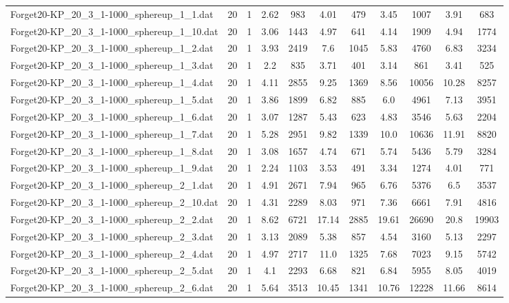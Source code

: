 \begin{table}[!ht]
\begin{tabular}{lcccccccccc}
Forget20-KP\_20\_3\_1-1000\_sphereup\_1\_1.dat & 20 & 1 & 2.62 & 983 & 4.01 & 479 & 3.45 & 1007 & 3.91 & 683 \\
Forget20-KP\_20\_3\_1-1000\_sphereup\_1\_10.dat & 20 & 1 & 3.06 & 1443 & 4.97 & 641 & 4.14 & 1909 & 4.94 & 1774 \\
Forget20-KP\_20\_3\_1-1000\_sphereup\_1\_2.dat & 20 & 1 & 3.93 & 2419 & 7.6 & 1045 & 5.83 & 4760 & 6.83 & 3234 \\
Forget20-KP\_20\_3\_1-1000\_sphereup\_1\_3.dat & 20 & 1 & 2.2 & 835 & 3.71 & 401 & 3.14 & 861 & 3.41 & 525 \\
Forget20-KP\_20\_3\_1-1000\_sphereup\_1\_4.dat & 20 & 1 & 4.11 & 2855 & 9.25 & 1369 & 8.56 & 10056 & 10.28 & 8257 \\
Forget20-KP\_20\_3\_1-1000\_sphereup\_1\_5.dat & 20 & 1 & 3.86 & 1899 & 6.82 & 885 & 6.0 & 4961 & 7.13 & 3951 \\
Forget20-KP\_20\_3\_1-1000\_sphereup\_1\_6.dat & 20 & 1 & 3.07 & 1287 & 5.43 & 623 & 4.83 & 3546 & 5.63 & 2204 \\
Forget20-KP\_20\_3\_1-1000\_sphereup\_1\_7.dat & 20 & 1 & 5.28 & 2951 & 9.82 & 1339 & 10.0 & 10636 & 11.91 & 8820 \\
Forget20-KP\_20\_3\_1-1000\_sphereup\_1\_8.dat & 20 & 1 & 3.08 & 1657 & 4.74 & 671 & 5.74 & 5436 & 5.79 & 3284 \\
Forget20-KP\_20\_3\_1-1000\_sphereup\_1\_9.dat & 20 & 1 & 2.24 & 1103 & 3.53 & 491 & 3.34 & 1274 & 4.01 & 771 \\
Forget20-KP\_20\_3\_1-1000\_sphereup\_2\_1.dat & 20 & 1 & 4.91 & 2671 & 7.94 & 965 & 6.76 & 5376 & 6.5 & 3537 \\
Forget20-KP\_20\_3\_1-1000\_sphereup\_2\_10.dat & 20 & 1 & 4.31 & 2289 & 8.03 & 971 & 7.36 & 6661 & 7.91 & 4816 \\
Forget20-KP\_20\_3\_1-1000\_sphereup\_2\_2.dat & 20 & 1 & 8.62 & 6721 & 17.14 & 2885 & 19.61 & 26690 & 20.8 & 19903 \\
Forget20-KP\_20\_3\_1-1000\_sphereup\_2\_3.dat & 20 & 1 & 3.13 & 2089 & 5.38 & 857 & 4.54 & 3160 & 5.13 & 2297 \\
Forget20-KP\_20\_3\_1-1000\_sphereup\_2\_4.dat & 20 & 1 & 4.97 & 2717 & 11.0 & 1325 & 7.68 & 7023 & 9.15 & 5742 \\
Forget20-KP\_20\_3\_1-1000\_sphereup\_2\_5.dat & 20 & 1 & 4.1 & 2293 & 6.68 & 821 & 6.84 & 5955 & 8.05 & 4019 \\
Forget20-KP\_20\_3\_1-1000\_sphereup\_2\_6.dat & 20 & 1 & 5.64 & 3513 & 10.45 & 1341 & 10.76 & 12228 & 11.66 & 8614 \\

\end{tabular}
\end{table}

